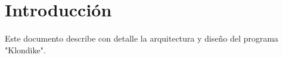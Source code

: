 \newpage
\section{Introducción}
\paragraph{}
Este documento describe con detalle la arquitectura y diseño del programa "Klondike".
